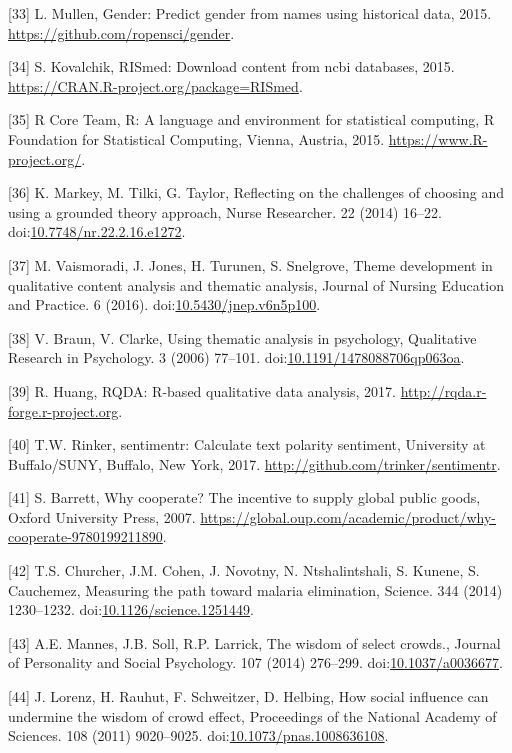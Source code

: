 \documentclass[]{article}
\begin{document}
\hypertarget{ref-Lincoln}{}
{[}33{]} L. Mullen, Gender: Predict gender from names using historical
data, 2015. \url{https://github.com/ropensci/gender}.

\hypertarget{ref-Kovalchik2015}{}
{[}34{]} S. Kovalchik, RISmed: Download content from ncbi databases,
2015. \url{https://CRAN.R-project.org/package=RISmed}.

\hypertarget{ref-R}{}
{[}35{]} R Core Team, R: A language and environment for statistical
computing, R Foundation for Statistical Computing, Vienna, Austria,
2015. \url{https://www.R-project.org/}.

\hypertarget{ref-Markey_2014}{}
{[}36{]} K. Markey, M. Tilki, G. Taylor, Reflecting on the challenges of
choosing and using a grounded theory approach, Nurse Researcher. 22
(2014) 16--22.
doi:\href{https://doi.org/10.7748/nr.22.2.16.e1272}{10.7748/nr.22.2.16.e1272}.

\hypertarget{ref-Vaismoradi_2016}{}
{[}37{]} M. Vaismoradi, J. Jones, H. Turunen, S. Snelgrove, Theme
development in qualitative content analysis and thematic analysis,
Journal of Nursing Education and Practice. 6 (2016).
doi:\href{https://doi.org/10.5430/jnep.v6n5p100}{10.5430/jnep.v6n5p100}.

\hypertarget{ref-Braun2006}{}
{[}38{]} V. Braun, V. Clarke, Using thematic analysis in psychology,
Qualitative Research in Psychology. 3 (2006) 77--101.
doi:\href{https://doi.org/10.1191/1478088706qp063oa}{10.1191/1478088706qp063oa}.

\hypertarget{ref-Ronggui2017}{}
{[}39{]} R. Huang, RQDA: R-based qualitative data analysis, 2017.
\url{http://rqda.r-forge.r-project.org}.

\hypertarget{ref-sentimentr2017}{}
{[}40{]} T.W. Rinker, sentimentr: Calculate text polarity sentiment,
University at Buffalo/SUNY, Buffalo, New York, 2017.
\url{http://github.com/trinker/sentimentr}.

\hypertarget{ref-barrett}{}
{[}41{]} S. Barrett, Why cooperate? The incentive to supply global
public goods, Oxford University Press, 2007.
\url{https://global.oup.com/academic/product/why-cooperate-9780199211890}.

\hypertarget{ref-Churcher_2014}{}
{[}42{]} T.S. Churcher, J.M. Cohen, J. Novotny, N. Ntshalintshali, S.
Kunene, S. Cauchemez, Measuring the path toward malaria elimination,
Science. 344 (2014) 1230--1232.
doi:\href{https://doi.org/10.1126/science.1251449}{10.1126/science.1251449}.

\hypertarget{ref-Mannes_2014}{}
{[}43{]} A.E. Mannes, J.B. Soll, R.P. Larrick, The wisdom of select
crowds., Journal of Personality and Social Psychology. 107 (2014)
276--299. doi:\href{https://doi.org/10.1037/a0036677}{10.1037/a0036677}.

\hypertarget{ref-Lorenz_2011}{}
{[}44{]} J. Lorenz, H. Rauhut, F. Schweitzer, D. Helbing, How social
influence can undermine the wisdom of crowd effect, Proceedings of the
National Academy of Sciences. 108 (2011) 9020--9025.
doi:\href{https://doi.org/10.1073/pnas.1008636108}{10.1073/pnas.1008636108}.
\end{document}
